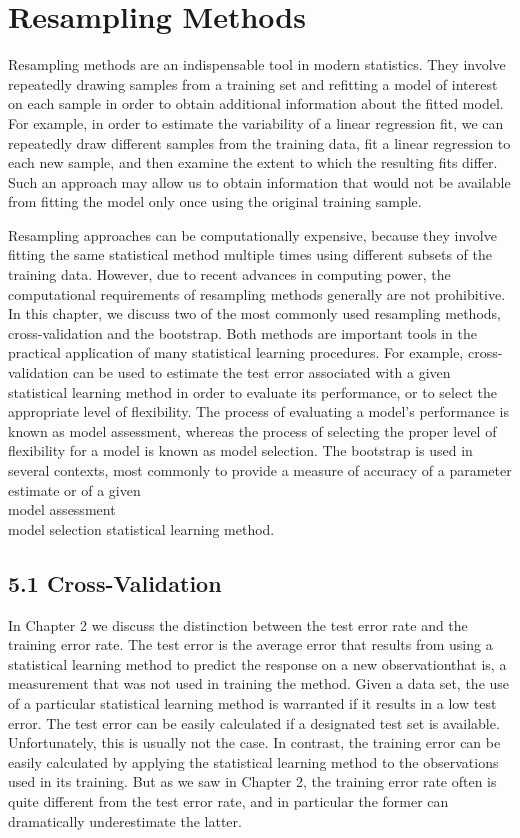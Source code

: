 \documentclass[10pt]{article}
\begin{document}
\section*{Resampling Methods}
Resampling methods are an indispensable tool in modern statistics. They involve repeatedly drawing samples from a training set and refitting a model of interest on each sample in order to obtain additional information about the fitted model. For example, in order to estimate the variability of a linear regression fit, we can repeatedly draw different samples from the training data, fit a linear regression to each new sample, and then examine the extent to which the resulting fits differ. Such an approach may allow us to obtain information that would not be available from fitting the model only once using the original training sample.

Resampling approaches can be computationally expensive, because they involve fitting the same statistical method multiple times using different subsets of the training data. However, due to recent advances in computing power, the computational requirements of resampling methods generally are not prohibitive. In this chapter, we discuss two of the most commonly used resampling methods, cross-validation and the bootstrap. Both methods are important tools in the practical application of many statistical learning procedures. For example, cross-validation can be used to estimate the test error associated with a given statistical learning method in order to evaluate its performance, or to select the appropriate level of flexibility. The process of evaluating a model's performance is known as model assessment, whereas the process of selecting the proper level of flexibility for a model is known as model selection. The bootstrap is used in several contexts, most commonly to provide a measure of accuracy of a parameter estimate or of a given\\
model assessment\\
model selection statistical learning method.

\subsection*{5.1 Cross-Validation}
In Chapter 2 we discuss the distinction between the test error rate and the training error rate. The test error is the average error that results from using a statistical learning method to predict the response on a new observationthat is, a measurement that was not used in training the method. Given a data set, the use of a particular statistical learning method is warranted if it results in a low test error. The test error can be easily calculated if a designated test set is available. Unfortunately, this is usually not the case. In contrast, the training error can be easily calculated by applying the statistical learning method to the observations used in its training. But as we saw in Chapter 2, the training error rate often is quite different from the test error rate, and in particular the former can dramatically underestimate the latter.
\end{document}
